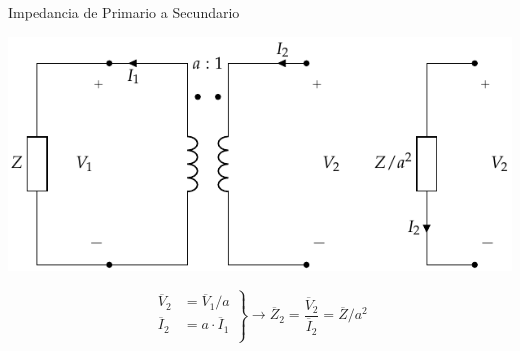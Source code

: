 \documentclass[xcolor={usenames,svgnames,dvipsnames}]{beamer}
\begin{document}
\begin{frame}[label={sec:org6f9a461}]{Impedancia de Primario a Secundario}
\begin{center}
\includegraphics[width=.9\linewidth]{../figs/TrafoIdeal_ZPrim.pdf}
\end{center}

\[
  \left.
    \begin{array}{ll}
    \overline{V}_2 &= \overline{V}_1 /a\\
    \overline{I}_2 &= a \cdot \overline{I}_1\\
  \end{array}\right\}
   \rightarrow \boxed{\overline{Z}_2 = \frac{\overline{V}_2}{\overline{I}_2} = \overline{Z} / a^2} 
\]
\end{frame}
\end{document}
